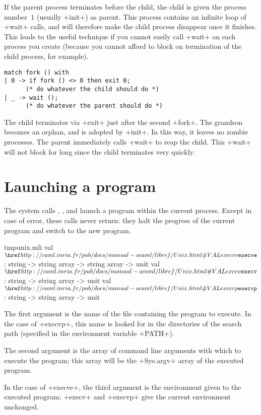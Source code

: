 \label{double-fork}
If the parent process terminates before the child, the child is
given the process number~$1$ (usually \ml+init+) as parent. This
process contains an infinite loop of \ml+wait+ calls, and will
therefore make the child process disappear once it finishes. This
leads to the useful  technique if you cannot
easily call \ml+wait+ on each process you create (because you cannot
afford to block on termination of the child process,
for example).
%
\begin{lstlisting}
match fork () with
| 0 -> if fork () <> 0 then exit 0; 
      (* do whatever the child should do *)
| _ -> wait ();
      (* do whatever the parent should do *)
\end{lstlisting}
%
The child terminates via \ml+exit+ just after the second \ml+fork+.
The grandson becomes an orphan, and is adopted by \ml+init+.  In this
way, it leaves no zombie processes. The parent immediately calls
\ml+wait+ to reap the child. This \ml+wait+ will not block for long
since the child terminates very quickly.

\medskip

\section{Launching a program}

The system calls , , and
 launch a program within the current process.
Except in case of error, these calls never return: they halt the progress
of the current program and switch to the new program.
%
\begin{listingcodefile}{tmpunix.mli}
val $\libvalue{Unix}{execve}$ : string -> string array -> string array -> unit
val $\libvalue{Unix}{execv}$  : string -> string array -> unit
val $\libvalue{Unix}{execvp}$ : string -> string array -> unit
\end{listingcodefile}
%
The first argument is the name of the file containing the program to
execute. In the case of \ml+execvp+, this name is looked for in the
directories of the search path (specified in the environment variable
\ml+PATH+).

\pagebreak

The second argument is the array of command line arguments with which
to execute the program; this array will be the \ml+Sys.argv+ array 
of the executed program.

In the case of \ml+execve+, the third argument is the environment
given to the executed program; \ml+execv+ and \ml+execvp+
give the current environment unchanged.

